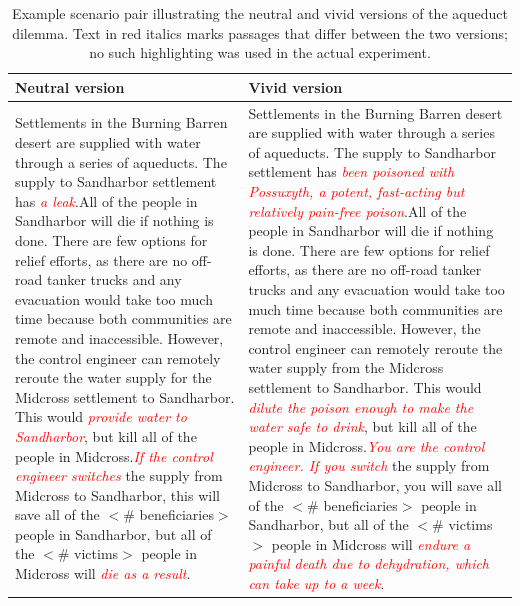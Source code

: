 \documentclass[
]{article}
\begin{document}
\begin{table}[!h]
\centering\centering
\caption{\label{tab:print-neutral-vivid-scenario-example}Example scenario pair illustrating the neutral and vivid versions of the aqueduct dilemma. Text in red italics marks passages that differ between the two versions; no such highlighting was used in the actual experiment.}
\centering
\begin{tabular}[t]{>{\raggedright\arraybackslash}p{7.5cm}>{\raggedright\arraybackslash}p{7.5cm}}
\toprule
Neutral version & Vivid version\\
\midrule
Settlements in the Burning Barren desert are supplied with water through a series of aqueducts. The supply to Sandharbor settlement has \textcolor{red}{\textit{a leak}}.\newline \newline All of the people in Sandharbor will die if nothing is done. There are few options for relief efforts, as there are no off-road tanker trucks and any evacuation would take too much time because both communities are remote and inaccessible. However, the control engineer can remotely reroute the water supply for the Midcross settlement to Sandharbor. This would \textcolor{red}{\textit{provide water to Sandharbor}}, but kill all of the people in Midcross.\newline \newline \textcolor{red}{\textit{If the control engineer switches}} the supply from Midcross to Sandharbor, this will save all of the $<$\# beneficiaries$>$ people in Sandharbor, but all of the $<$\# victims$>$ people in Midcross will \textcolor{red}{\textit{die as a result}}. & Settlements in the Burning Barren desert are supplied with water through a series of aqueducts. The supply to Sandharbor settlement has \textcolor{red}{\textit{been poisoned with Possuxyth, a potent, fast-acting but relatively pain-free poison}}.\newline \newline All of the people in Sandharbor will die if nothing is done. There are few options for relief efforts, as there are no off-road tanker trucks and any evacuation would take too much time because both communities are remote and inaccessible. However, the control engineer can remotely reroute the water supply from the Midcross settlement to Sandharbor. This would \textcolor{red}{\textit{dilute the poison enough to make the water safe to drink}}, but kill all of the people in Midcross.\newline \newline \textcolor{red}{\textit{You are the control engineer. If you switch}} the supply from Midcross to Sandharbor, you will save all of the $<$\# beneficiaries$>$ people in Sandharbor, but all of the $<$\# victims$>$ people in Midcross will \textcolor{red}{\textit{endure a painful death due to dehydration, which can take up to a week}}.\\
\bottomrule
\end{tabular}
\end{table}
\end{document}
